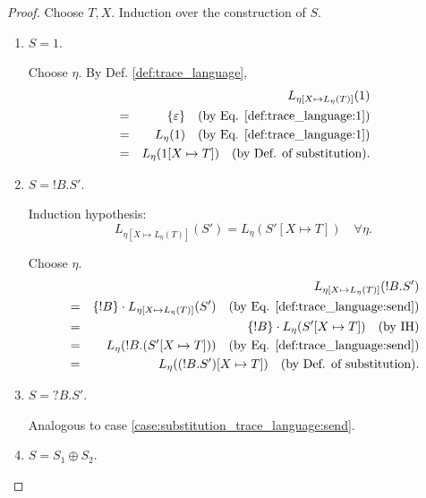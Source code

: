\documentclass{llncs}
\newcommand*{\send}{\mathord{!}}
\newcommand*{\recv}{\mathord{?}}
\newcommand*{\echoice}{\oplus}
\newcommand*{\concat}{\cdot}
\renewcommand*{\|}{\;|\;}
\renewcommand*{\epsilon}{\varepsilon}
\begin{document}
\begin{proof}
  Choose $T, X$. Induction over the construction of $S$.
  \begin{enumerate}
    \item
      \label{case:substitution_trace_language:1}
      $S = 1$.

      Choose $\eta$. By Def. \ref{def:trace_language},
      \begin{eqnarray*}
        &&  L_{\eta[X \mapsto L_\eta(T)]}(1) \\
        &=& \{\epsilon\}
            \quad \text{(by Eq. \ref{def:trace_language:1})} \\
        &=& L_\eta(1)
            \quad \text{(by Eq. \ref{def:trace_language:1})} \\
        &=& L_\eta(1[X \mapsto T])
            \quad \text{(by Def. of substitution)}.
      \end{eqnarray*}

    \item
      \label{case:substitution_trace_language:send}
      $S = \send B.S'$.

      Induction hypothesis:
      \begin{equation*}
        L_{\eta[X \mapsto L_\eta(T)]}(S') = L_\eta(S'[X \mapsto T]) \quad \forall \eta.
      \end{equation*}

      Choose $\eta$.
      \begin{eqnarray*}
        &&  L_{\eta[X \mapsto L_\eta(T)]}(\send B.S') \\
        &=& \{\send B\} \concat L_{\eta[X \mapsto L_\eta(T)]}(S')
            \quad \text{(by Eq. \ref{def:trace_language:send})} \\
        &=& \{\send B\} \concat L_\eta(S'[X \mapsto T])
            \quad \text{(by IH)} \\
        &=& L_\eta(\send B.(S'[X \mapsto T]))
            \quad \text{(by Eq. \ref{def:trace_language:send})} \\
        &=& L_\eta((\send B.S')[X \mapsto T])
            \quad \text{(by Def. of substitution)}.
      \end{eqnarray*}

    \item
      \label{case:substitution_trace_language:recv}
      $S = \recv B.S'$.

      Analogous to case \ref{case:substitution_trace_language:send}.

    \item
      \label{case:substitution_trace_language:echoice}
      $S = S_1 \echoice S_2$.


\end{enumerate}
\end{proof}
\end{document}
